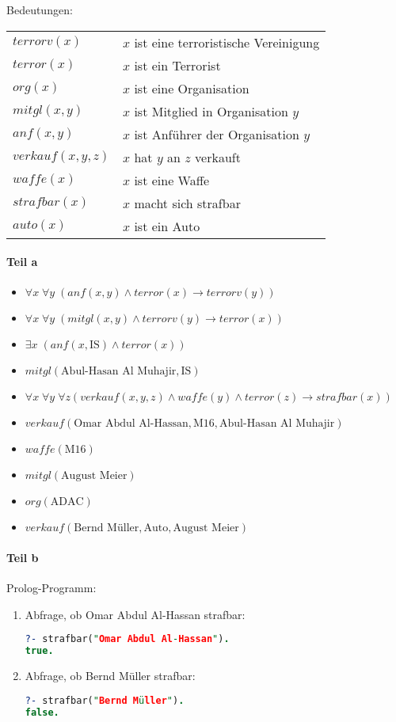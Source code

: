 Bedeutungen:\\
\begin{tabular}{l l}
$terrorv(x)$ & $x$ ist eine terroristische Vereinigung\\
$terror(x)$ & $x$ ist ein Terrorist\\
$org(x)$ & $x$ ist eine Organisation\\
$mitgl(x,y)$ & $x$ ist Mitglied in Organisation $y$\\
$anf(x,y)$ & $x$ ist Anführer der Organisation $y$\\
$verkauf(x,y,z)$ & $x$ hat $y$ an $z$ verkauft\\
$waffe(x)$ & $x$ ist eine Waffe\\
$strafbar(x)$ & $x$ macht sich strafbar\\
$auto(x)$ & $x$ ist ein Auto
\end{tabular}
\paragraph*{Teil a}
\begin{itemize}
\item $\forall x\; \forall y\;(anf(x,y) \wedge terror(x) \to terrorv(y) )$
\item $\forall x\;\forall y\; (mitgl(x,y) \wedge terrorv(y) \to terror(x))$
\item $\exists x\; (anf(x,\text{IS}) \wedge terror(x))$
\item $mitgl(\text{Abul-Hasan Al Muhajir},\text{IS})$
\item $\forall x\; \forall y\; \forall z ( verkauf(x,y,z) \wedge waffe(y) \wedge terror(z) \to strafbar(x))$
\item $verkauf(\text{Omar Abdul Al-Hassan},\text{M16},\text{Abul-Hasan Al Muhajir})$
\item $waffe(\text{M16})$
\item $mitgl(\text{August Meier})$
\item $org(\text{ADAC})$
\item $verkauf(\text{Bernd Müller}, \text{Auto},\text{August Meier})$
\end{itemize}

\paragraph*{Teil b}
Prolog-Programm:

\begin{enumerate}[label=(\roman*)]
\item Abfrage, ob Omar Abdul Al-Hassan strafbar:
\begin{lstlisting}[language=Prolog]
?- strafbar("Omar Abdul Al-Hassan").
true.
\end{lstlisting}
\item Abfrage, ob Bernd Müller strafbar:
\begin{lstlisting}[language=Prolog]
?- strafbar("Bernd Müller").
false.
\end{lstlisting}
\end{enumerate}
